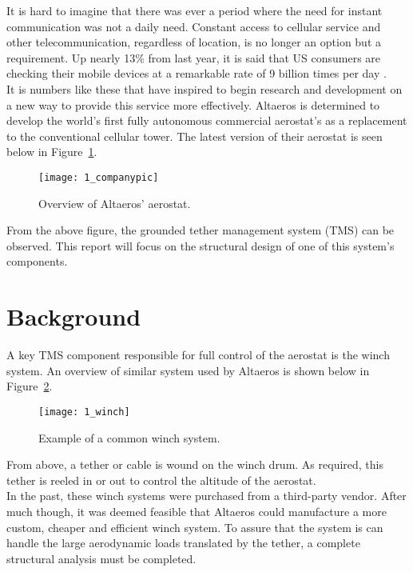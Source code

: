 \label{chapt:intro}

It is hard to imagine that there was ever a period where the need for instant communication was not a daily need. Constant access to cellular service and other telecommunication, regardless of location, is no longer an option but a requirement. Up nearly 13\% from last year, it is said that US consumers are checking their mobile devices at a remarkable rate of 9 billion times per day \cite{deloittestat}.\\

It is numbers like these that have inspired \Company to begin research and development on a new way to provide this service more effectively. Altaeros is determined to develop the world's first fully autonomous commercial aerostat's as a replacement to the conventional cellular tower. The latest version of their aerostat is seen below in Figure~\ref{fig:1_companypic}.

\begin{figure}[H]
	\centering
	\texttt{[image: 1\_companypic]}
	\caption[Overview of Altaeros' aerostat.]{Overview of Altaeros' aerostat.\protect\cite{companypicweb}}
	\label{fig:1_companypic}
\end{figure}

From the above figure, the grounded tether management system (TMS) can be observed. This report will focus on the structural design of one of this system's components.

\section{Background} 

A key TMS component responsible for full control of the aerostat is the winch system. An overview of similar system used by Altaeros is shown below in Figure~\ref{fig:1_winch}.
\begin{figure}[H]
	\centering
	\texttt{[image: 1\_winch]}
	\caption[Example of a common winch system.]{Example of a common winch system.\protect\cite{winchpic}}
	\label{fig:1_winch}
\end{figure}

From above, a tether or cable is wound on the winch drum. As required, this tether is reeled in or out to control the altitude of the aerostat.\\

In the past, these winch systems were purchased from a third-party vendor. After much though, it was deemed feasible that Altaeros could manufacture a more custom, cheaper and efficient winch system. To assure that the system is can handle the large aerodynamic loads translated by the tether, a complete structural analysis must be completed.

